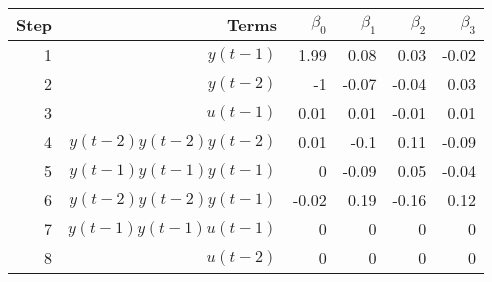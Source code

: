 \begin{tabular}{rrrrrr}
Step & Terms & $\beta_{0}$ & $\beta_{1}$ & $\beta_{2}$ & $\beta_{3}$ \\ 
\hline 
1 & $y(t-1)$ & 1.99 & 0.08 & 0.03 & -0.02 \\ 
2 & $y(t-2)$ & -1 & -0.07 & -0.04 & 0.03 \\ 
3 & $u(t-1)$ & 0.01 & 0.01 & -0.01 & 0.01 \\ 
4 & $y(t-2)y(t-2)y(t-2)$ & 0.01 & -0.1 & 0.11 & -0.09 \\ 
5 & $y(t-1)y(t-1)y(t-1)$ & 0 & -0.09 & 0.05 & -0.04 \\ 
6 & $y(t-2)y(t-2)y(t-1)$ & -0.02 & 0.19 & -0.16 & 0.12 \\ 
7 & $y(t-1)y(t-1)u(t-1)$ & 0 & 0 & 0 & 0 \\ 
8 & $u(t-2)$ & 0 & 0 & 0 & 0 \\ 
\hline 
\end{tabular}